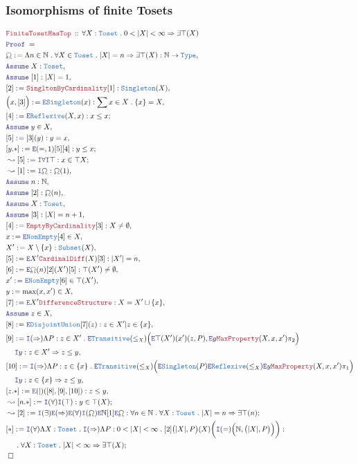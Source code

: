 \documentclass[12pt]{scrartcl}
\newcommand{\TYPE}[1]{\textcolor{NavyBlue}{\mathtt{#1}}}
\newcommand{\LOGIC}[1]{\textcolor{Blue}{\mathtt{#1}}}
\newcommand{\THM}[1]{\textcolor{Maroon}{\mathtt{#1}}}
\renewcommand{\.}{\; . \;}
\newcommand{\de}{: \kern 0.1pc =}
\newcommand{\Theorem}[2]{& \THM{#1} \, :: \, #2 \\ & \Proof = \\ }
\newcommand{\NewLine}{\\ & \kern 1pc}
\newcommand{\Page}[1]{ \begin{align*} #1 \end{align*}   }
\newcommand{\Imply}{\Rightarrow}
\newcommand{\Intro}{\LOGIC{I}}
\newcommand{\Elim}{\LOGIC{E}}
\newcommand{\Type}{\TYPE{Type}}
\newcommand{\Nat}{\mathbb{N} }
\newcommand{\Say}[3]{& #1 \de #2 : #3, \\}
\newcommand{\SayIn}[3]{& #1 \de #2 \in #3, \\}
\newcommand{\Conclude}[3]{& #1 \de #2 : #3; \\}
\newcommand{\Derive}[3]{& \leadsto #1 \de #2 : #3, \\}
\newcommand{\DeriveConclude}[3]{& \leadsto #1 \de #2 : #3 ; \\}
\newcommand{\Assume}[2]{& \LOGIC{Assume} \; #1 : #2, \\}
\newcommand{\AssumeIn}[2]{& \LOGIC{Assume} \; #1 \in #2, \\}
\newcommand{\QED}{\; \square}
\newcommand{\EndProof}{& \QED \\}
\newcommand{\Proof}{\LOGIC{Proof} \; }
\newcommand{\Toset}{\TYPE{Toset}}
\begin{document}
\subsubsection{Isomorphisms of finite Tosets}
\Page{
	\Theorem{FiniteTosetHasTop}
	{
		\forall X : \Toset \.
		 0 < |X| < \infty \Imply
		\exists \top(X)
	}
	\Say{\leo}{\Lambda n \in \Nat \. \forall X \in \Toset \. |X| = n \Imply \exists \top(X) }
	{
		\Nat \to \Type
	}
	\Assume{X}{\Toset}
	\Assume{[1]}{|X| = 1}
	\Say{[2]}{\THM{SingltonByCardinality}[1]}{\TYPE{Singleton}(X)}
	\Say{\Big( x,[3]\Big)}{\Elim \TYPE{Singleton}(x)}
	{
		\sum x \in X \. \{x\} = X	
	}
	\Conclude{[4]}{\Elim \TYPE{Reflexive}(X,x)}{x \le x}
	\AssumeIn{y}{X}
	\Say{[5]}{[3](y)}{y = x}
	\Conclude{[y.*]}{ \Elim(=,1)[5][4]}{ y \le x}
	\DeriveConclude{[5]}{\Intro \forall \Intro \top }{ x \in \top X  } 
	\Derive{[1]}{\Intro \leo}{ \leo(1)  }
	\Assume{n}{\Nat}
	\Assume{[2]}{\leo(n)}
	\Assume{X}{\Toset}
	\Assume{[3]}{|X| = n + 1}
	\Say{[4]}{\THM{EmptyByCardinality}[3]}{X \neq \emptyset}
	\SayIn{x}{\Elim \TYPE{NonEmpty}[4]}{X}
	\Say{X'}{X \setminus \{x\}}{\TYPE{Subset}(X)}
	\Say{[5]}{\Elim X' \THM{CardinalDiff}(X)[3] }{ |X'| = n }
	\Say{[6]}{\Elim \leo(n) [2](X')[5]}{\top(X') \neq \emptyset}
	\SayIn{x'}{\Elim \TYPE{NonEmpty}[6]}{\top(X')}
	\SayIn{y}{\max(x,x')}{X}
	\Say{[7]}{\Elim X' \THM{DifferenceStructure}}{X = X' \sqcup \{x\}}
	\AssumeIn{z}{X}
	\Say{[8]}{\Elim \TYPE{DisjointUnion} [7] (z) }{ z \in X' | z \in \{x\}}
	\Say{[9]}{
		\Intro (\Imply)  
		\Lambda P :  z \in X' \. 
			\Elim \TYPE{Transitive}(\le_X)
			\Big(
				\Elim \top(X')(x')(z,P) , 
				\Elim y \THM{MaxProperty}(X,x,x') \pi_2 
			\Big)
			\NewLine 
			\Intro y
	}
	{
		z \in X' \Imply  z \le y
	}
	\Say{[10]}
	{
		\Intro (\Imply) 
		\Lambda P : z \in \{x\} \.
		\Elim \TYPE{Transitive}(\le_X)
		\Big(
			\Elim \TYPE{Singleton}(P)
			\Elim \TYPE{Reflexive}(\le_X)
			\Elim y
			\THM{MaxProperty}(X,x,x') \pi_1
		\Big)
		\NewLine
		\Intro y
	}
	{
		z \in \{x\} \Imply z \le y
	}
	\Say{[z.*]}{\Elim(|)([8],[9],[10])}
	{
		z \le y
	}
	\DeriveConclude{[n.*]}{\Intro(\forall) \Intro(\top)}{y \in \top(X)}
	\DeriveConclude{[2]}{\Intro(\exists)\Elim(\Imply)\Elim(\forall)\Intro(\leo) \Elim \Nat [1] \Elim \leo   }
	{
		\forall n \in \Nat \. 
		\forall X  : \Toset \. 
		|X| = n \Imply \exists \top(n)
	}
	\Conclude{[*]}{ 
		\Intro(\forall) 
		\Lambda X : \Toset \. 
		\Intro(\Imply) 
		\Lambda P : 0 <|X| < \infty \. 
			[2]\big(|X|,P\big)(X)\bigg( \Intro(=)\Big(\Nat, \big( |X|,P \big) \Big) \bigg)  
		}{
			\NewLine \. 
			\forall X : \Toset \. 
			|X| < \infty \Imply \exists \top(X)
		}
	\EndProof
}
\end{document}
